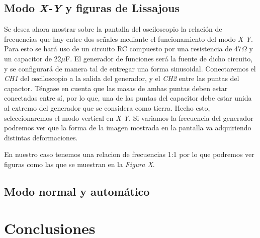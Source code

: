 \documentclass{article}
\begin{document}
\subsection{Modo \textit{X-Y} y figuras de Lissajous}
	
	Se desea ahora mostrar sobre la pantalla del osciloscopio la relación de frecuencias que hay entre dos señales mediante el funcionamiento del modo \textit{X-Y}. Para esto se hará uso de un circuito RC compuesto por una resistencia de 47$\Omega$ y un capacitor de 22$\mu$F. El generador de funciones será la fuente de dicho circuito, y se configurará de manera tal de entregar una forma sinusoidal. Conectaremos el \textit{CH1} del osciloscopio a la salida del generador, y el \textit{CH2} entre las puntas del capactor. Téngase en cuenta que las masas de ambas puntas deben estar conectadas entre sí, por lo que, una de las puntas del capacitor debe estar unida al extremo del generador que se considera como tierra. Hecho esto, seleccionaremos el modo vertical en \textit{X-Y}. Si variamos la frecuencia del generador podremos ver que la forma de la imagen mostrada en la pantalla va adquiriendo distintas deformaciones. 
	\par
	En nuestro caso tenemos una relacion de frecuencias 1:1 por lo que podremos ver figuras como las que se muestran en la \textit{Figura X}.



	
\bigskip



\subsection{Modo normal y automático}

	

\bigskip\bigskip	




\section{Conclusiones}
\end{document}
